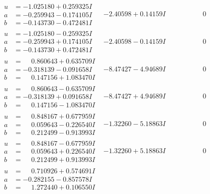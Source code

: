 \documentclass[1p]{elsarticle_modified}
\theoremstyle{definition}
\begin{document}
$$\begin{array}{c|c|c}
\begin{aligned}
u &= -1.025180 + 0.259325 I \\
a &= -0.259943 - 0.174105 I \\
b &= -0.143730 - 0.472481 I\end{aligned}
 & -2.40598 + 0.14159 I & \phantom{-0.000000 } 0 \\ \hline\begin{aligned}
u &= -1.025180 - 0.259325 I \\
a &= -0.259943 + 0.174105 I \\
b &= -0.143730 + 0.472481 I\end{aligned}
 & -2.40598 - 0.14159 I & \phantom{-0.000000 } 0 \\ \hline\begin{aligned}
u &= \phantom{-}0.860643 + 0.635709 I \\
a &= -0.318139 - 0.091658 I \\
b &= \phantom{-}0.147156 + 1.083470 I\end{aligned}
 & -8.47427 - 4.94689 I & \phantom{-0.000000 } 0 \\ \hline\begin{aligned}
u &= \phantom{-}0.860643 - 0.635709 I \\
a &= -0.318139 + 0.091658 I \\
b &= \phantom{-}0.147156 - 1.083470 I\end{aligned}
 & -8.47427 + 4.94689 I & \phantom{-0.000000 } 0 \\ \hline\begin{aligned}
u &= \phantom{-}0.848167 + 0.677959 I \\
a &= \phantom{-}0.059643 - 0.226540 I \\
b &= \phantom{-}0.212499 - 0.913993 I\end{aligned}
 & -1.32260 - 5.18863 I & \phantom{-0.000000 } 0 \\ \hline\begin{aligned}
u &= \phantom{-}0.848167 - 0.677959 I \\
a &= \phantom{-}0.059643 + 0.226540 I \\
b &= \phantom{-}0.212499 + 0.913993 I\end{aligned}
 & -1.32260 + 5.18863 I & \phantom{-0.000000 } 0 \\ \hline\begin{aligned}
u &= \phantom{-}0.710926 + 0.574691 I \\
a &= -0.282155 - 0.857578 I \\
b &= \phantom{-}1.272440 + 0.106550 I\end{aligned}

\end{array}$$
\end{document}
